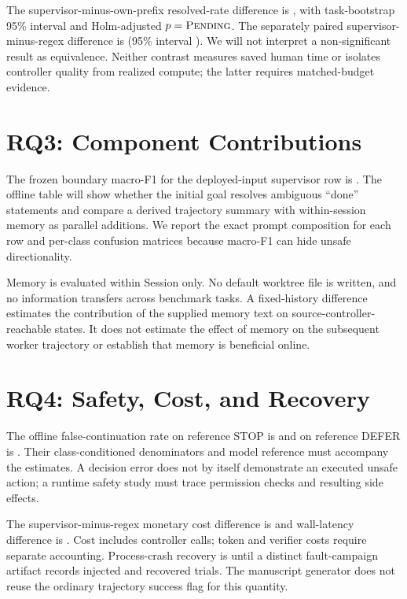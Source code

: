 \documentclass[sigconf,nonacm]{acmart}
\begin{document}


The supervisor-minus-own-prefix resolved-rate difference is \SupervisorDelta{}, with task-bootstrap 95\% interval \SupervisorDeltaCI{} and Holm-adjusted $p=\textsc{Pending}{}$. The separately paired supervisor-minus-regex difference is \RegexDelta{} (95\% interval \RegexDeltaCI{}). We will not interpret a non-significant result as equivalence. Neither contrast measures saved human time or isolates controller quality from realized compute; the latter requires matched-budget evidence.

\section{RQ3: Component Contributions}

The frozen boundary macro-F1 for the deployed-input supervisor row is \BoundaryMacroFOne{}. The offline table will show whether the initial goal resolves ambiguous ``done'' statements and compare a derived trajectory summary with within-session memory as parallel additions. We report the exact prompt composition for each row and per-class confusion matrices because macro-F1 can hide unsafe directionality.

Memory is evaluated within Session only. No default worktree file is written, and no information transfers across benchmark tasks. A fixed-history difference estimates the contribution of the supplied memory text on source-controller-reachable states. It does not estimate the effect of memory on the subsequent worker trajectory or establish that memory is beneficial online.

\section{RQ4: Safety, Cost, and Recovery}

The offline false-continuation rate on reference STOP is \StopUnsafeRate{} and on reference DEFER is \DeferUnsafeRate{}. Their class-conditioned denominators and model reference must accompany the estimates. A decision error does not by itself demonstrate an executed unsafe action; a runtime safety study must trace permission checks and resulting side effects.

The supervisor-minus-regex monetary cost difference is \CostDelta{} and wall-latency difference is \LatencyDelta{}. Cost includes controller calls; token and verifier costs require separate accounting. Process-crash recovery is \RecoveryRate{} until a distinct fault-campaign artifact records injected and recovered trials. The manuscript generator does not reuse the ordinary trajectory success flag for this quantity.
\end{document}
